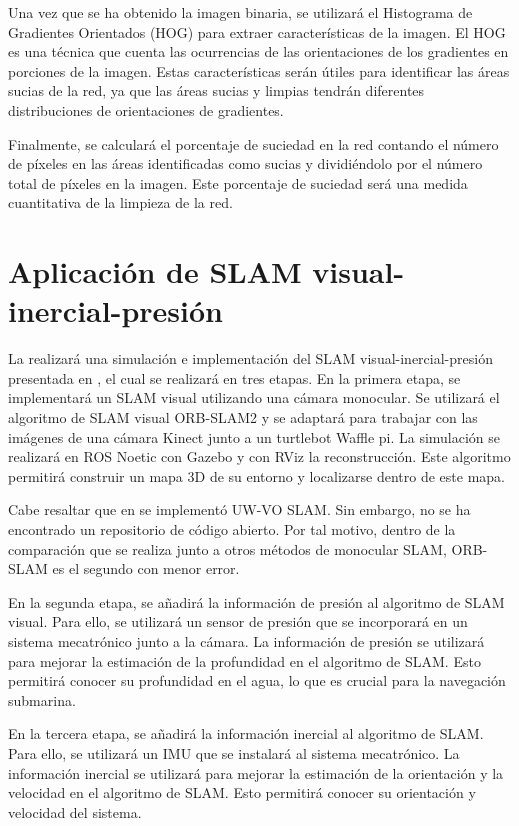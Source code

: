 Una vez que se ha obtenido la imagen binaria, se utilizará el Histograma de Gradientes Orientados (HOG) para extraer características de la imagen. El HOG es una técnica que cuenta las ocurrencias de las orientaciones de los gradientes en porciones de la imagen. Estas características serán útiles para identificar las áreas sucias de la red, ya que las áreas sucias y limpias tendrán diferentes distribuciones de orientaciones de gradientes.

Finalmente, se calculará el porcentaje de suciedad en la red contando el número de píxeles en las áreas identificadas como sucias y dividiéndolo por el número total de píxeles en la imagen. Este porcentaje de suciedad será una medida cuantitativa de la limpieza de la red.

\section{Aplicación de SLAM visual-inercial-presión} \label{VIP_SLAM}

La realizará una simulación e implementación del SLAM visual-inercial-presión presentada en \cite{cite:Ferrera}, el cual se realizará en tres etapas. En la primera etapa, se implementará un SLAM visual utilizando una cámara monocular. Se utilizará el algoritmo de SLAM visual ORB-SLAM2 \cite{murTRO2015} y se adaptará para trabajar con las imágenes de una cámara Kinect junto a un turtlebot Waffle pi. La simulación se realizará en ROS Noetic con Gazebo y con RViz la reconstrucción. Este algoritmo permitirá construir un mapa 3D de su entorno y localizarse dentro de este mapa. 

Cabe resaltar que en \cite{cite:Ferrera} se implementó UW-VO SLAM. Sin embargo, no se ha encontrado un repositorio de código abierto. Por tal motivo, dentro de la comparación que se realiza junto a otros métodos de monocular SLAM, ORB-SLAM es el segundo con menor error. 

En la segunda etapa, se añadirá la información de presión al algoritmo de SLAM visual. Para ello, se utilizará un sensor de presión que se incorporará en un sistema mecatrónico junto a la cámara. La información de presión se utilizará para mejorar la estimación de la profundidad en el algoritmo de SLAM. Esto permitirá conocer su profundidad en el agua, lo que es crucial para la navegación submarina.

En la tercera etapa, se añadirá la información inercial al algoritmo de SLAM. Para ello, se utilizará un IMU que se instalará al sistema mecatrónico. La información inercial se utilizará para mejorar la estimación de la orientación y la velocidad en el algoritmo de SLAM. Esto permitirá conocer su orientación y velocidad del sistema.
